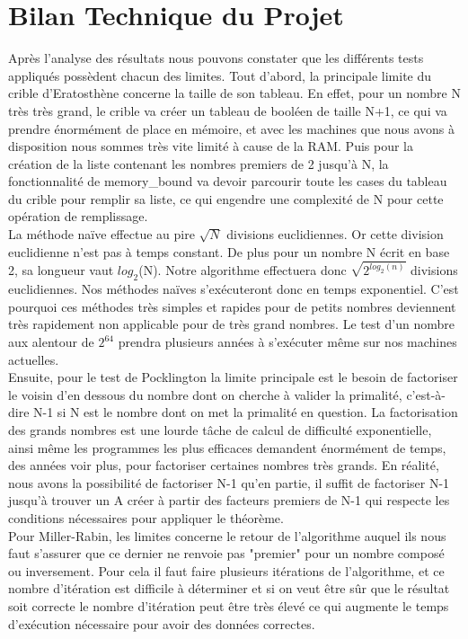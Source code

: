	\section{Bilan Technique du Projet}	
		Après l'analyse des résultats nous pouvons constater que les différents tests appliqués possèdent chacun des limites.	
		Tout d'abord, la principale limite du crible d'Eratosthène concerne la taille de son tableau. En effet, pour un nombre N très très grand, le crible va créer un tableau de booléen de taille N+1, ce qui va prendre énormément de place en mémoire, et avec les machines que nous avons à disposition nous sommes très vite limité à cause de la RAM. Puis pour la création de la liste contenant les nombres premiers de 2 jusqu'à N, la fonctionnalité de memory\_bound va devoir parcourir toute les cases du tableau du crible pour remplir sa liste, ce qui engendre une complexité de N pour cette opération de remplissage.\\
		
		La méthode naïve effectue au pire $\sqrt{N}$ divisions euclidiennes. Or cette division euclidienne n'est pas à temps constant. De plus pour un nombre N écrit en base 2, sa longueur vaut $log_2$(N). Notre algorithme effectuera donc $\sqrt{2^{log_2(n)}}$ divisions euclidiennes. Nos méthodes naïves s’exécuteront donc en temps exponentiel. C'est pourquoi ces méthodes très simples et rapides pour de petits nombres deviennent très rapidement non applicable pour de très grand nombres. Le test d'un nombre aux alentour de $2^{64}$ prendra plusieurs années à s’exécuter même sur nos machines actuelles.\\
		
		Ensuite, pour le test de Pocklington la limite principale est le besoin de factoriser le voisin d’en dessous du nombre dont on cherche à valider la primalité, c’est-à-dire N-1 si N est le nombre dont on met la primalité en question. La factorisation des grands nombres est une lourde tâche de calcul de difficulté exponentielle, ainsi même les programmes les plus efficaces demandent énormément de temps, des années voir plus, pour factoriser certaines nombres très grands.
En réalité, nous avons la possibilité de factoriser N-1 qu’en partie, il suffit de factoriser N-1 jusqu’à trouver un A créer à partir des facteurs premiers de N-1 qui respecte les conditions nécessaires pour appliquer le théorème.\\

		Pour Miller-Rabin, les limites concerne le retour de l'algorithme auquel ils nous faut s'assurer que ce dernier ne renvoie pas "premier" pour un nombre composé ou inversement. Pour cela il faut faire plusieurs itérations de l'algorithme, et ce nombre d'itération est difficile à déterminer et si on veut être sûr que le résultat soit correcte le nombre d'itération peut être très élevé ce qui augmente le temps d'exécution nécessaire pour avoir des données correctes.\\	
		
